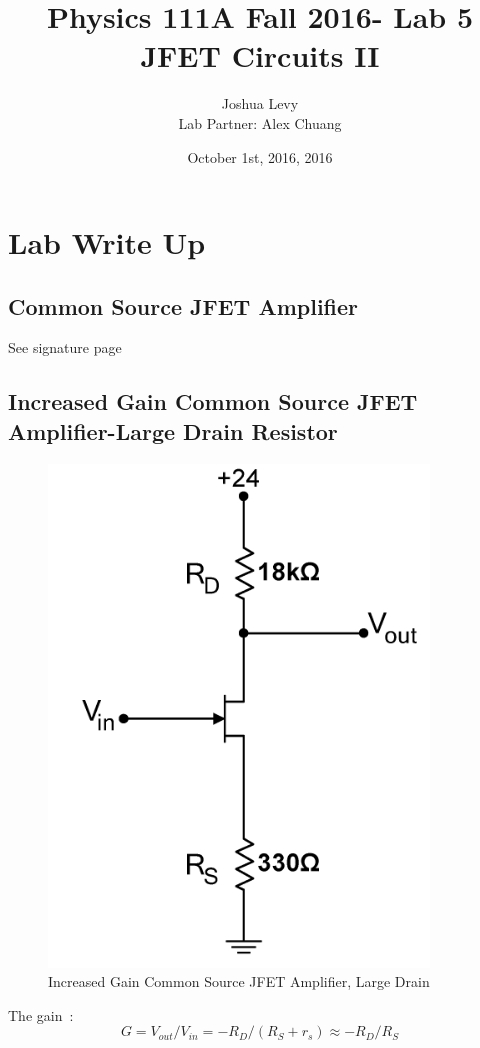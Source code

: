 \documentclass{article}
\title{Physics 111A Fall 2016- Lab 5\\
JFET Circuits II}
\author{Joshua Levy\\Lab Partner: Alex Chuang}
\date{October 1st, 2016, 2016}
\begin{document}
\maketitle

\section{Lab Write Up}
\subsection{Common Source JFET Amplifier}
    See signature page
\subsection{Increased Gain Common Source JFET Amplifier-Large Drain Resistor}
    \begin{figure}[H]
        \centering
        \includegraphics[scale = 0.6]{5_2.png}
        \caption{Increased Gain Common Source JFET Amplifier, Large Drain~\cite{webfig}}
        \label{fig:my_label}
    \end{figure}
    The gain~\cite{webfig}:
    \begin{equation}
        G = V_{out}/V_{in} = -R_D/(R_S+r_s)\approx-R_D/R_S
    \end{equation}
\end{document}
